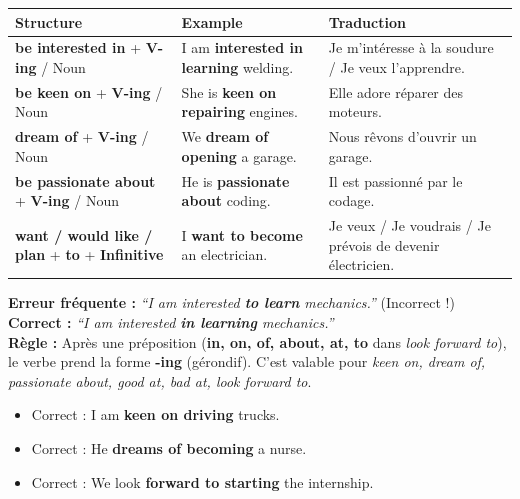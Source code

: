 \documentclass[11pt]{article}
\begin{document}
\begin{propriete}
\begin{center}
\begin{tabularx}{\linewidth}{|l|X|X|}
\hline
\rowcolor{popgreenL}
\textbf{Structure} & \textbf{Example} & \textbf{Traduction} \\
\hline
\textbf{be interested in} + \textbf{V-ing} / Noun & I am \textbf{interested in learning} welding. & Je m'intéresse à la soudure / Je veux l'apprendre. \\
\textbf{be keen on} + \textbf{V-ing} / Noun & She is \textbf{keen on repairing} engines. & Elle adore réparer des moteurs. \\
\textbf{dream of} + \textbf{V-ing} / Noun & We \textbf{dream of opening} a garage. & Nous rêvons d'ouvrir un garage. \\
\textbf{be passionate about} + \textbf{V-ing} / Noun & He is \textbf{passionate about} coding. & Il est passionné par le codage. \\
\textbf{want / would like / plan} + \textbf{to} + \textbf{Infinitive} & I \textbf{want to become} an electrician. & Je veux / Je voudrais / Je prévois de devenir électricien. \\
\hline
\end{tabularx}
\end{center}
\end{propriete}

\begin{attention}
\textbf{Erreur fréquente :} \emph{``I am interested \textbf{to learn} mechanics.''} (Incorrect !) \\
\textbf{Correct :} \emph{``I am interested \textbf{in learning} mechanics.''} \\
\textbf{Règle :} Après une préposition (\textbf{in, on, of, about, at, to} dans \emph{look forward to}), le verbe prend la forme \textbf{-ing} (gérondif). C'est valable pour \emph{keen on, dream of, passionate about, good at, bad at, look forward to}.
\begin{itemize}
    \item Correct : I am \textbf{keen on driving} trucks.
    \item Correct : He \textbf{dreams of becoming} a nurse.
    \item Correct : We look \textbf{forward to starting} the internship.
\end{itemize}
\end{attention}
\end{document}
